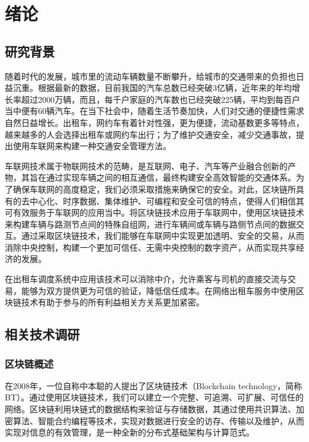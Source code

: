 
\chapter{绪论}

\section{研究背景}

随着时代的发展，城市里的流动车辆数量不断攀升，给城市的交通带来的负担也日益沉重。根据最新的数据，目前我国的汽车总数已经突破3亿辆，近年来的年均增长率超过2000万辆，而且，每千户家庭的汽车数也已经突破225辆，平均到每百户当中便有60辆汽车\cite{gonganbu2022}。在当下社会中，随着生活节奏加快，人们对交通的便捷性需求自然日益增长。出租车，网约车有着针对性强，更为便捷，流动基数更多等特点，越来越多的人会选择出租车或网约车出行；为了维护交通安全，减少交通事故，提出使用车联网来构建一种交通安全管理方法\cite{Koul2022}。

车联网技术属于物联网技术的范畴，是互联网、电子、汽车等产业融合创新的产物，其旨在通过实现车辆之间的相互通信，最终构建安全高效智能的交通体系\cite{song2021}。为了确保车联网的高度稳定，我们必须采取措施来确保它的安全。对此，区块链所具有的去中心化、时序数据、集体维护、可编程和安全可信的特点，使得人们相信其可有效服务于车联网的应用当中\cite{liu2023}。将区块链技术应用于车联网中，使用区块链技术来构建车辆与路测节点间的特殊自组网，进行车辆间或车辆与路侧节点间的数据交互。通过采取区块链技术，我们能够在车联网中实现更加透明、安全的交易，从而消除中央控制，构建一个更加可信任、无需中央控制的数字资产，从而实现共享经济的发展。

在出租车调度系统中应用该技术可以消除中介，允许乘客与司机的直接交流与交易，能够为双方提供更为可信的验证，降低信任成本。在网络出租车服务中使用区块链技术有助于参与的所有利益相关方关系更加紧密\cite{dorri2017}。

\section{相关技术调研}

\subsection{区块链概述}

在2008年，一位自称中本聪的人提出了区块链技术\cite{nakamoto2008}（Blockchain technology，简称BT）。通过使用区块链技术，我们可以建立一个完整、可追溯、可扩展、可信任的网络。区块链利用块链式的数据结构来验证与存储数据，其通过使用共识算法、加密算法、智能合约编程等技术，实现对数据进行安全的访存、传输以及维护，从而实现对信息的有效管理，是一种全新的分布式基础架构与计算范式\cite{xue2020}。

